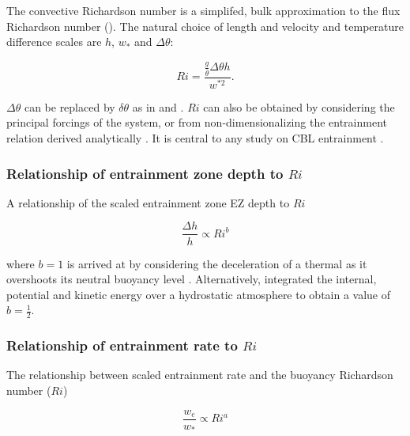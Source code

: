 The convective Richardson number is a simplifed, bulk approximation to the flux Richardson number (\citep{Stull-BLMetIntro}).  The natural choice of length and velocity and temperature difference scales are $h$, $w_{*}$ and $\Delta \theta$:

\begin{equation}
Ri = \frac{\frac{g}{\overline{\theta}} \Delta \theta h}{w^{*2}}.
\end{equation}

$\Delta \theta$ can be replaced by $\delta \theta$ as in \cite{FedConzMir04} and \cite{GarciaMellado}.  $Ri$ can also be obtained by considering the principal forcings of the system, or from non-dimensionalizing the entrainment relation derived analytically \citep{Tennekes73, Deardorff72}. It is central to any study on CBL entrainment \citep{SullMoengStev, FedConzMir04, Traum11, BrooksFowler2}.


\subsubsection{Relationship of entrainment zone depth to $Ri$}

A relationship of the scaled entrainment zone EZ depth to $Ri$

\begin{equation}\label{eq:dhvsri}
\frac{\Delta h}{h} \propto Ri ^{b}
\end{equation}

where $b=1$ is arrived at by considering the deceleration of a thermal
as it overshoots its neutral buoyancy level \cite{StullNelEl}.  Alternatively, \cite{Boers89} integrated the internal, potential and kinetic energy over a hydrostatic atmosphere to obtain a value of $b=\frac{1}{2}$.

\subsubsection{Relationship of entrainment rate to $Ri$}
\label{subsec:erri}
The relationship between scaled entrainment rate and the buoyancy Richardson number ($Ri$)

\begin{equation}\label{eq:ervsri}
\frac{w_{e}}{w_{*}} \propto Ri^{a}
\end{equation}

